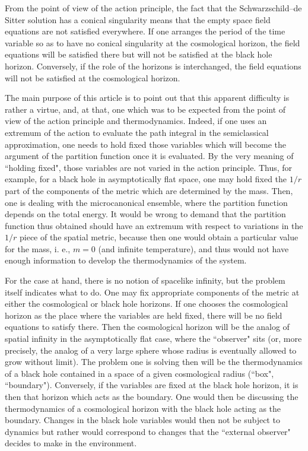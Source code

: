 \documentclass[a4paper,preprintnumbers,amsmath,amssymb]{revtex4}
\begin{document}
From the point of view of the action principle, the fact that the
Schwarzschild--de Sitter solution has a conical
singularity means that the empty space field equations are not satisfied
everywhere. If one arranges the period of the time variable so as to have no
conical singularity at the cosmological horizon, the field equations will be
satisfied there but will not be satisfied at the black hole horizon.
Conversely, if the role of the horizons is interchanged, the field equations
will not be satisfied at the cosmological horizon.

The main purpose of this article is to point out that this apparent
difficulty is rather a virtue, and, at  that,  one which was to be expected
from the point of view of the action principle and thermodynamics. Indeed, if one uses an
extremum of the action to evaluate the path integral in the semiclassical
approximation, one needs to hold fixed those variables which will become the
argument of the partition function once it is evaluated. By the very meaning
of ``holding fixed", those variables are not varied in the action
principle. Thus, for example, for a black hole in asymptotically flat space,
one may hold fixed the $1/r$ part of the components of the metric
which are determined by the mass. Then, one is dealing with the
microcanonical ensemble, where the partition function depends on the total
energy. It would be wrong to demand that the partition function thus
obtained should have an extremum with respect to variations in the $1/r$
piece of the spatial metric, because then one would obtain a particular
value for the mass, i. e., $m=0$ (and infinite temperature), and thus would not have enough information
to develop the thermodynamics of the system.

For the case at hand, there is no notion of spacelike infinity, but the
problem itself indicates what to do. One may fix appropriate components of
the metric at either the cosmological or black hole horizons. If one chooses
the cosmological horizon as the place where the variables are held fixed,
there will be no field equations to satisfy there.
Then the cosmological horizon will be the analog of
spatial infinity in the asymptotically flat case, where the ``observer" sits
(or, more precisely, the analog of a very large sphere whose radius is
eventually allowed to grow without limit). The problem one is solving then
will be the thermodynamics of a black hole contained in a space of a given
cosmological radius (``box", ``boundary"). Conversely, if the variables are fixed
at the black hole horizon, it is then that horizon which acts as the
boundary. One would then be discussing the thermodynamics of a cosmological
horizon with the black hole acting as the boundary. Changes in the black
hole variables would then not be subject  to dynamics but rather would
correspond to changes that the ``external observer" decides to make in the
environment.
\end{document}
